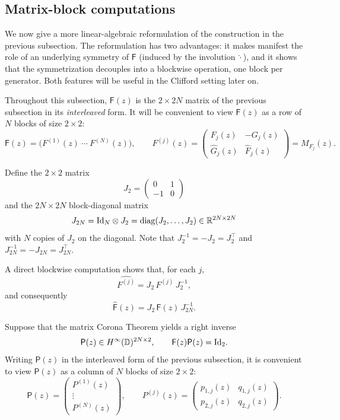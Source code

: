 \documentclass[11pt]{amsart}
\begin{document}
\subsection{Matrix-block computations}
\label{ss:matrix-block}

We now give a more linear-algebraic reformulation of the construction in the previous subsection.  The reformulation has two advantages: it makes manifest the role of an underlying symmetry of $\mathsf{F}$ (induced by the involution $\hat{\cdot}$), and it shows that the symmetrization decouples into a blockwise operation, one block per generator.  Both features will be useful in the Clifford setting later on.

Throughout this subsection, $\mathsf{F}(z)$ is the $2 \times 2N$ matrix of the previous subsection in its \emph{interleaved} form.  It will be convenient to view $\mathsf{F}(z)$ as a row of $N$ blocks of size $2\times 2$:
$$
\mathsf{F}(z)=
\bigl(F^{(1)}(z)\ \cdots\ F^{(N)}(z)\bigr),
\qquad
F^{(j)}(z)=
\begin{pmatrix}
F_j(z) & -G_j(z)\\
\hat G_j(z) & \hat{F}_j(z)
\end{pmatrix}
= M_{F_j}(z).
$$

Define the $2 \times 2$ matrix
$$
J_2=
\begin{pmatrix}
0 & 1\\
-1 & 0
\end{pmatrix}
$$
and the $2N \times 2N$ block-diagonal matrix
$$
J_{2N}=\textnormal{Id}_N\otimes J_2 = \operatorname{diag}(J_2,\dots,J_2)\in \mathbb{R}^{2N\times 2N}
$$
with $N$ copies of $J_2$ on the diagonal.  Note that $J_2^{-1} = -J_2 = J_2^\top$ and $J_{2N}^{-1} = -J_{2N} = J_{2N}^\top$.

A direct blockwise computation shows that, for each $j$,
$$
\widehat{F^{(j)}}=J_2\, F^{(j)}\, J_2^{-1},
$$
and consequently
\begin{equation}
\label{eq:symmetry-F}
\widehat{\mathsf{F}}(z)=J_2\,\mathsf{F}(z)\,J_{2N}^{-1}.
\end{equation}

Suppose that the matrix Corona Theorem yields a right inverse
$$
\mathsf{P}(z)\in H^\infty(\mathbb D)^{2N\times 2},
\qquad
\mathsf{F}(z)\mathsf{P}(z)=\textnormal{Id}_2.
$$
Writing $\mathsf{P}(z)$ in the interleaved form of the previous subsection, it is convenient to view $\mathsf{P}(z)$ as a column of $N$ blocks of size $2 \times 2$:
$$
\mathsf{P}(z)=
\begin{pmatrix}
P^{(1)}(z) \\
\vdots\\
P^{(N)}(z)
\end{pmatrix},
\qquad
P^{(j)}(z)=
\begin{pmatrix}
p_{1,j}(z) & q_{1,j}(z)\\
p_{2,j}(z) & q_{2,j}(z)
\end{pmatrix}.
$$
\end{document}
